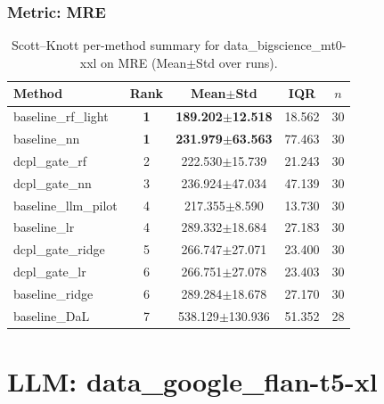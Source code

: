 \subsubsection*{Metric: MRE}
\begin{table}[H]
\centering
\scriptsize
\setlength{\tabcolsep}{4pt}
\renewcommand{\arraystretch}{1.1}
\caption{Scott--Knott per-method summary for data\_bigscience\_mt0-xxl on MRE (Mean$\pm$Std over runs).}
\label{tab:sk_data_bigscience_mt0-xxl_MRE}
\begin{tabular}{l|c|c|c|c}
\hline
\textbf{Method} & \textbf{Rank} & \textbf{Mean$\pm$Std} & \textbf{IQR} & \textbf{$n$} \\
\hline
\rowcolor{red!15} baseline\_rf\_light & \textbf{1} & \textbf{189.202$\pm$12.518} & 18.562 & 30 \\
\rowcolor{red!15} baseline\_nn & \textbf{1} & \textbf{231.979$\pm$63.563} & 77.463 & 30 \\
dcpl\_gate\_rf & 2 & 222.530$\pm$15.739 & 21.243 & 30 \\
dcpl\_gate\_nn & 3 & 236.924$\pm$47.034 & 47.139 & 30 \\
baseline\_llm\_pilot & 4 & 217.355$\pm$8.590 & 13.730 & 30 \\
baseline\_lr & 4 & 289.332$\pm$18.684 & 27.183 & 30 \\
dcpl\_gate\_ridge & 5 & 266.747$\pm$27.071 & 23.400 & 30 \\
dcpl\_gate\_lr & 6 & 266.751$\pm$27.078 & 23.403 & 30 \\
baseline\_ridge & 6 & 289.284$\pm$18.678 & 27.170 & 30 \\
baseline\_DaL & 7 & 538.129$\pm$130.936 & 51.352 & 28 \\
\hline
\end{tabular}
\end{table}


\newpage

\section*{LLM: data\_google\_flan-t5-xl}

